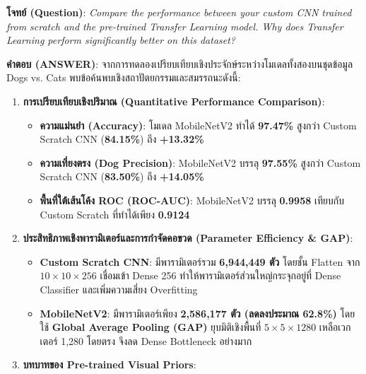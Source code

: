 \documentclass[12pt,a4paper]{article}
\begin{document}
\begin{ansbox}[fontupper=\small, left=6pt, right=6pt, top=3pt, bottom=3pt]
{\raggedright \textbf{โจทย์ (Question)}: \textit{Compare the performance between your custom CNN trained from scratch and the pre-trained Transfer Learning model. Why does Transfer Learning perform significantly better on this dataset?}\par}

\vspace{0.25em}
\textbf{คำตอบ (ANSWER)}:
จากการทดลองเปรียบเทียบเชิงประจักษ์ระหว่างโมเดลทั้งสองบนชุดข้อมูล Dogs vs. Cats พบข้อค้นพบเชิงสถาปัตยกรรมและสมรรถนะดังนี้:

\begin{enumerate}[leftmargin=14pt, itemsep=1.5pt, topsep=1pt, parsep=0pt]
    \item \textbf{การเปรียบเทียบเชิงปริมาณ (Quantitative Performance Comparison)}:
    \begin{itemize}[leftmargin=10pt, itemsep=0.5pt, topsep=0.5pt, parsep=0pt]
        \item \textbf{ความแม่นยำ (Accuracy)}: โมเดล MobileNetV2 ทำได้ \textbf{97.47\%} สูงกว่า Custom Scratch CNN (\textbf{84.15\%}) ถึง \textbf{+13.32\%}
        \item \textbf{ความเที่ยงตรง (Dog Precision)}: MobileNetV2 บรรลุ \textbf{97.55\%} สูงกว่า Custom Scratch CNN (\textbf{83.50\%}) ถึง \textbf{+14.05\%}
        \item \textbf{พื้นที่ใต้เส้นโค้ง ROC (ROC-AUC)}: MobileNetV2 บรรลุ \textbf{0.9958} เทียบกับ Custom Scratch ที่ทำได้เพียง \textbf{0.9124}
    \end{itemize}
    \item \textbf{ประสิทธิภาพเชิงพารามิเตอร์และการกำจัดคอขวด (Parameter Efficiency \& GAP)}:
    \begin{itemize}[leftmargin=10pt, itemsep=0.5pt, topsep=0.5pt, parsep=0pt]
        \item \textbf{Custom Scratch CNN}: มีพารามิเตอร์รวม \textbf{6,944,449 ตัว} โดยชั้น Flatten จาก $10\times10\times256$ เชื่อมเข้า Dense 256 ทำให้พารามิเตอร์ส่วนใหญ่กระจุกอยู่ที่ Dense Classifier และเพิ่มความเสี่ยง Overfitting
        \item \textbf{MobileNetV2}: มีพารามิเตอร์เพียง \textbf{2,586,177 ตัว (ลดลงประมาณ 62.8\%)} โดยใช้ \textbf{Global Average Pooling (GAP)} ยุบมิติเชิงพื้นที่ $5 \times 5 \times 1280$ เหลือเวกเตอร์ 1,280 โดยตรง จึงลด Dense Bottleneck อย่างมาก
    \end{itemize}
    \item \textbf{บทบาทของ Pre-trained Visual Priors}:

\end{enumerate}
\end{ansbox}
\end{document}
